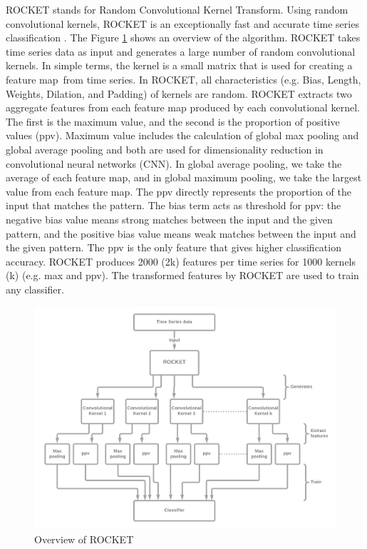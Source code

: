 ROCKET stands for Random Convolutional Kernel Transform. Using random convolutional kernels, ROCKET is an exceptionally fast and accurate time series classification \cite{dempster_etal_2020}. The Figure \ref{fig:OverviewROCKET} shows an overview of the algorithm. ROCKET takes time series data as input and generates a large number of random convolutional kernels. In simple terms, the kernel is a small matrix that is used for creating a feature map from time series. In ROCKET, all characteristics (e.g. Bias, Length, Weights, Dilation, and Padding) of kernels are random. ROCKET extracts two aggregate features from each feature map produced by each convolutional kernel. The first is the maximum value, and the second is the proportion of positive values (ppv). Maximum value includes the calculation of global max pooling and global average pooling and both are used for dimensionality reduction in convolutional neural networks (CNN). In global average pooling, we take the average of each feature map, and in global maximum pooling, we take the largest value from each feature map. The ppv directly represents the proportion of the input that matches the pattern. The bias term acts as threshold for ppv: the negative bias value means strong matches between the input and the given pattern, and the positive bias value means weak matches between the input and the given pattern. The ppv is the only feature that gives higher classification accuracy. ROCKET produces 2000 (2k) features per time series for 1000 kernels (k) (e.g. max and ppv). The transformed features by ROCKET are used to train any classifier.

\begin{figure}[ht]
	\centering
	\includegraphics[width=\textwidth]{gfx/Overview of ROCKET.PNG}
	\captionsetup{justification=centering}
	\caption{Overview of ROCKET}
	\label{fig:OverviewROCKET}
\end{figure}

